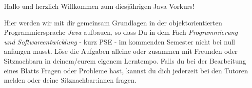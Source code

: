 

\begin{center}
	Hallo und herzlich Willkommen zum diesjährigen Java Vorkurs!\\
\end{center}
Hier werden wir mit dir gemeinsam Grundlagen in der objektorientierten Programmiersprache \textit{Java} aufbauen, so dass Du in dem Fach \textit{Programmierung und Softwareentwicklung} - kurz PSE - im kommenden Semester nicht bei null anfangen musst.\newline
Löse die Aufgaben alleine oder zusammen mit Freunden oder Sitznachbarn in deinem/eurem eigenem Lerntempo.\newline
Falls du bei der Bearbeitung eines Blatts Fragen oder Probleme hast, kannst du dich jederzeit bei den Tutoren melden oder deine Sitznachbar:innen fragen.\newline

\addexcercise
